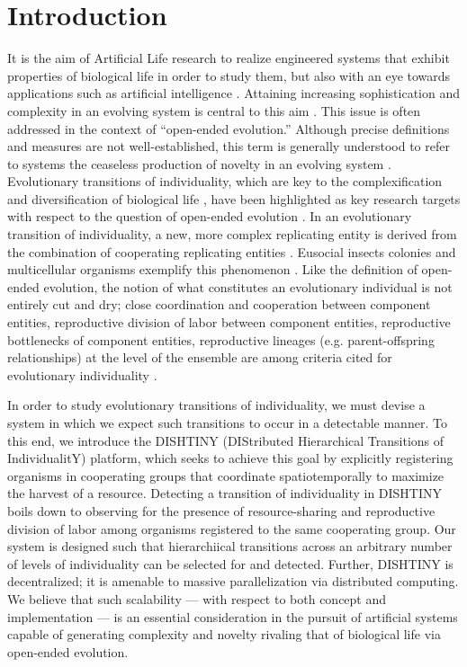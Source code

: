 \section{Introduction}

It is the aim of Artificial Life research to realize engineered systems that exhibit properties of biological life in order to study them, but also with an eye towards applications such as artificial intelligence \citep{bedau2003artificial}.
Attaining increasing sophistication and complexity in an evolving system is central to this aim \citep{goldsby2017increasing}.
This issue is often addressed in the context of ``open-ended evolution.''
Although precise definitions and measures are not well-established, this term is generally understood to refer to systems the ceaseless production of novelty in an evolving system \citep{taylor2016open}.
Evolutionary transitions of individuality, which are key to the complexification and diversification of biological life \citep{smith1997major}, have been highlighted as key research targets with respect to the question of open-ended evolution \citep{ray1996evolving, banzhaf2016defining}.
In an evolutionary transition of individuality, a new, more complex replicating entity is derived from the combination of cooperating replicating entities \citep{west2015major}.
Eusocial insects colonies and multicellular organisms exemplify this phenomenon \cite{smith1997major}.
Like the definition of open-ended evolution, the notion of what constitutes an evolutionary individual is not entirely cut and dry; close coordination and cooperation between component entities, reproductive division of labor between component entities, reproductive bottlenecks of component entities, reproductive lineages (e.g. parent-offspring relationships) at the level of the ensemble are among criteria cited for evolutionary individuality
\citep{ereshefsky2015rethinking, bouchard2013symbiotic}.

In order to study evolutionary transitions of individuality, we must devise a system in which we expect such transitions to occur in a detectable manner.
To this end, we introduce the DISHTINY (DIStributed Hierarchical Transitions of IndividualitY) platform, which seeks to achieve this goal by explicitly registering organisms in cooperating groups that coordinate spatiotemporally to maximize the harvest of a resource.
Detecting a transition of individuality in DISHTINY boils down to observing for the presence of resource-sharing and reproductive division of labor among organisms registered to the same cooperating group.
Our system is designed such that hierarchiical transitions across an arbitrary number of levels of individuality can be selected for and detected.
Further, DISHTINY is decentralized; it is amenable to massive parallelization via distributed computing.
We believe that such scalability --- with respect to both concept and implementation --- is an essential consideration in the pursuit of artificial systems capable of generating complexity and novelty rivaling that of biological life via open-ended evolution.

